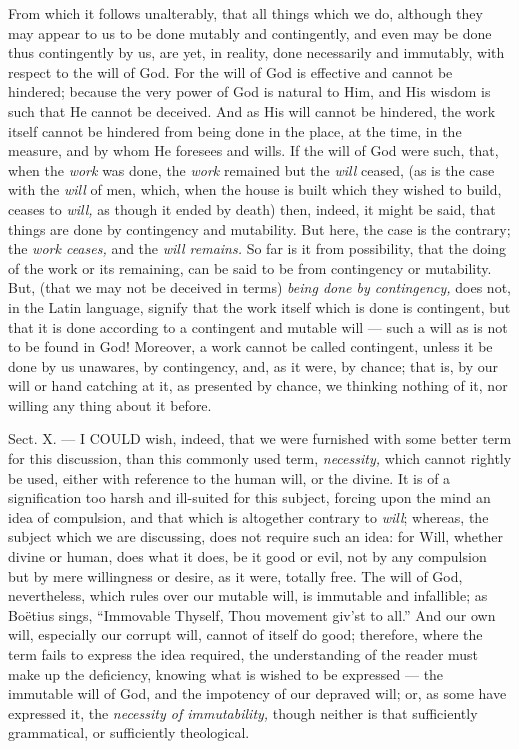 From which it follows unalterably, that all things which we do, although they may appear to us to be done mutably and contingently, and even may be done thus contingently by us, are yet, in reality, done necessarily and immutably, with respect to the will of God. For the will of God is effective and cannot be hindered; because the very power of God is natural to Him, and His wisdom is such that He cannot be deceived. And as His will cannot be hindered, the work itself cannot be hindered from being done in the place, at the time, in the measure, and by whom He foresees and wills. If the will of God were such, that, when the \emph{work }was done, the \emph{work }remained but the \emph{will }ceased, (as is the case with the \emph{will }of men, which, when the house is built which they wished to build, ceases to \emph{will, }as though it ended by death) then, indeed, it might be said, that things are done by contingency and mutability. But here, the case is the contrary; the \emph{work ceases, }and the \emph{will remains. }So far is it from possibility, that the doing of the work or its remaining, can be said to be from contingency or mutability. But, (that we may not be deceived in terms) \emph{being done by contingency, }does not, in the Latin language, signify that the work itself which is done is contingent, but that it is done according to a contingent and mutable will — such a will as is not to be found in God! Moreover, a work cannot be called contingent, unless it be done by us unawares, by contingency, and, as it were, by chance; that is, by our will or hand catching at it, as presented by chance, we thinking nothing of it, nor willing any thing about it before.


Sect. X. — I COULD wish, indeed, that we were furnished with some better term for this discussion, than this commonly used term, \emph{necessity, }which cannot rightly be used, either with reference to the human will, or the divine. It is of a signification too harsh and ill-suited for this subject, forcing upon the mind an idea of compulsion, and that which is altogether contrary to \emph{will}; whereas, the subject which we are discussing, does not require such an idea: for Will, whether divine or human, does what it does, be it good or evil, not by any compulsion but by mere willingness or desire, as it were, totally free. The will of God, nevertheless, which rules over our mutable will, is immutable and infallible; as Boëtius sings, “Immovable Thyself, Thou movement giv’st to all.” And our own will, especially our corrupt will, cannot of itself do good; therefore, where the term fails to express the idea required, the understanding of the reader must make up the deficiency, knowing what is wished to be expressed — the immutable will of God, and the impotency of our depraved will; or, as some have expressed it, the \emph{necessity of immutability, }though neither is that sufficiently grammatical, or sufficiently theological.

